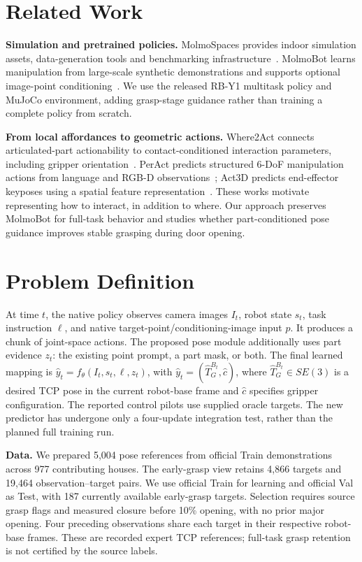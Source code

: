 \documentclass{article}
\begin{document}
\section{Related Work}
\label{sec:related}
\textbf{Simulation and pretrained policies.}
MolmoSpaces provides indoor simulation assets, data-generation tools and
benchmarking infrastructure~\citep{kim2026molmospaces}. MolmoBot learns
manipulation from large-scale synthetic demonstrations and supports optional
image-point conditioning~\citep{deshpande2026molmobot}. We use the released
RB-Y1 multitask policy and MuJoCo environment, adding grasp-stage guidance
rather than training a complete policy from scratch.

\textbf{From local affordances to geometric actions.}
Where2Act connects articulated-part actionability to contact-conditioned
interaction parameters, including gripper orientation~\citep{mo2021where2act}.
PerAct predicts structured 6-DoF manipulation actions from language and
RGB-D observations~\citep{shridhar2023peract}; Act3D predicts end-effector
keyposes using a spatial feature representation~\citep{gervet2023act3d}.
These works motivate representing how to interact, in addition to where.
Our approach preserves MolmoBot for full-task behavior and studies whether
part-conditioned pose guidance improves stable grasping during door opening.

\section{Problem Definition}
\label{sec:problem}
At time $t$, the native policy observes camera images $I_t$, robot state $s_t$,
task instruction $\ell$, and native target-point/conditioning-image input $p$.
It produces a chunk of joint-space actions. The proposed pose module additionally
uses part evidence $z_t$: the existing point prompt, a part mask, or both.
The final learned mapping is $\hat y_t=f_\theta(I_t,s_t,\ell,z_t)$, with
$\hat y_t=(\hat T^{B_t}_{G},\hat c)$, where
$\hat T^{B_t}_{G}\in SE(3)$ is a desired TCP pose in the current robot-base
frame and $\hat c$ specifies gripper configuration. The reported control pilots
use supplied oracle targets. The new predictor has undergone only a four-update
integration test, rather than the planned full training run.

\textbf{Data.} We prepared 5,004 pose references from official Train
demonstrations across 977 contributing houses. The early-grasp view retains 4,866 targets
and 19,464 observation--target pairs. We use official Train for learning and
official Val as Test, with 187 currently available early-grasp targets.
Selection requires source grasp flags and measured closure before 10\% opening,
with no prior major opening. Four preceding observations share each target in
their respective robot-base frames. These are recorded expert TCP references;
full-task grasp retention is not certified by the source labels.
\end{document}
